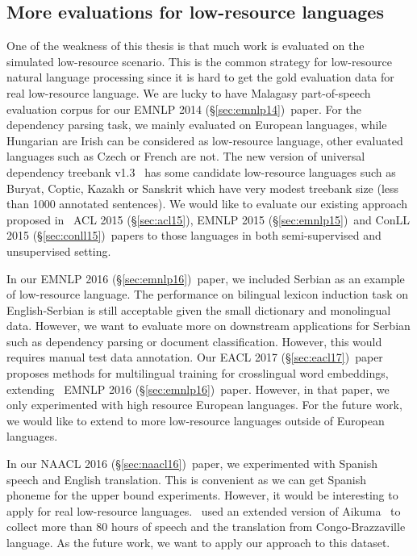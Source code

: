 \documentclass[12pt,twoside,final,hidelinks]{ltthesis}
\theoremstyle{definition}
\newcommand\emnlpiv{EMNLP 2014 (\S\ref{sec:emnlp14})}
\newcommand\conllv{ConLL 2015 (\S\ref{sec:conll15})}
\newcommand\aclv{ACL 2015 (\S\ref{sec:acl15})}
\newcommand\emnlpv{EMNLP 2015 (\S\ref{sec:emnlp15})}
\newcommand\naaclvi{NAACL 2016 (\S\ref{sec:naacl16})}
\newcommand\emnlpvi{EMNLP 2016 (\S\ref{sec:emnlp16})}
\newcommand\eaclvii{EACL 2017 (\S\ref{sec:eacl17})}
\begin{document}
\subsection{More evaluations for low-resource languages} 
One of the weakness of this thesis is that much work is evaluated on the simulated low-resource scenario.
This is the common strategy for low-resource natural language processing since it is hard to get the gold evaluation data 
for real low-resource language. We are lucky to have Malagasy part-of-speech evaluation corpus for our \emnlpiv\ paper. 
For the dependency parsing task, we mainly evaluated on European languages, while Hungarian are Irish can be considered as  
low-resource language, other evaluated languages such as Czech or French are not. 
The new version of universal dependency 
treebank v1.3~\cite{11234/1-1699} has some candidate low-resource languages such as Buryat, Coptic, Kazakh or Sanskrit
which have very modest treebank size (less than 1000 annotated sentences). We would like to evaluate our existing approach 
proposed in ~\aclv, \emnlpv\ and \conllv\ papers to those languages in both semi-supervised and unsupervised setting. 

In our \emnlpvi\ paper, we included Serbian as an example of low-resource language. The performance on bilingual lexicon induction 
task on English-Serbian is still acceptable given the small dictionary and monolingual data. However, we want to evaluate more 
on downstream applications for Serbian such as dependency parsing or document classification. However, this would requires manual 
test data annotation. Our \eaclvii\ paper proposes methods for multilingual training for crosslingual word embeddings, extending 
~\emnlpvi\ paper. However, in that paper, we only experimented with high resource European languages. For the future work, we would 
like to extend to more low-resource languages outside of European languages. 

In our \naaclvi\ paper, we experimented with Spanish speech and English translation. This is convenient as we can get Spanish phoneme 
for the upper bound experiments. However, it would be interesting to apply for real low-resource languages.~ used 
an extended version of Aikuma~\cite{bird-EtAl:2014:W14-22} to collect more than 80 hours of speech and the translation from Congo-Brazzaville
language. As the future work, we want to apply our approach to this dataset. 
\end{document}
